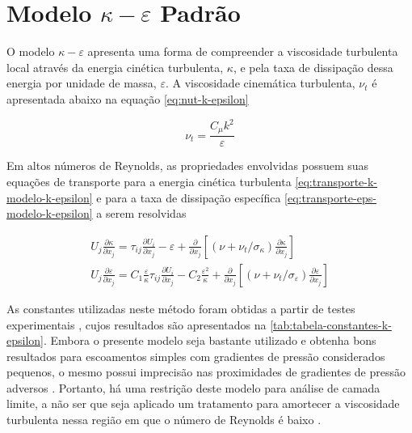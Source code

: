 \section{Modelo \texorpdfstring{\(\kappa-\varepsilon\)}{k-e} Padrão}

O modelo \(\kappa-\varepsilon\) \cite{JONES1972301,LAUNDER1974269,launder1974} apresenta uma forma de compreender a viscosidade turbulenta local através da energia cinética turbulenta, \(\kappa\), e pela taxa de dissipação dessa energia por unidade de massa, \(\varepsilon\). A viscosidade cinemática turbulenta, \(\nu_{t}\) é apresentada abaixo na equação \ref{eq:nut-k-epsilon}

\begin{equation}
    \nu_t = \frac{C_\mu k^2}{\varepsilon}
    \label{eq:nut-k-epsilon}
\end{equation}

Em altos números de Reynolds, as propriedades envolvidas possuem suas equações de transporte para a energia cinética turbulenta \ref{eq:transporte-k-modelo-k-epsilon} e para a taxa de dissipação específica \ref{eq:transporte-eps-modelo-k-epsilon} a serem resolvidas \cite{Wilcox2006}

\begin{gather}
    U_{j} \frac{\partial \kappa}{\partial x_j} = \tau_{ij}\frac{\partial U_i}{\partial x_j} - \varepsilon + \frac{\partial}{\partial x_j}\left[\left(\nu + \nu_{t}/\sigma_{\kappa}\right)\frac{\partial \kappa}{\partial x_j}\right]
    \label{eq:transporte-k-modelo-k-epsilon}
    \\
   	U_{j} \frac{\partial \varepsilon}{\partial x_j} = C_{1}\frac{\varepsilon}{\kappa}\tau_{ij}\frac{\partial U_i}{\partial x_j} - C_{2}\frac{\varepsilon^{2}}{\kappa} + \frac{\partial}{\partial x_j}\left[\left(\nu + \nu_{t}/\sigma_{\varepsilon}\right)\frac{\partial \varepsilon}{\partial x_j}\right]
    \label{eq:transporte-eps-modelo-k-epsilon}
\end{gather}
	
As constantes utilizadas neste método foram obtidas a partir de testes experimentais \cite{JONES1972301}, cujos resultados são apresentados na \autoref{tab:tabela-constantes-k-epsilon}. Embora o presente modelo seja bastante utilizado e obtenha bons resultados para escoamentos simples com gradientes de pressão considerados pequenos, o mesmo possui imprecisão nas proximidades de gradientes de pressão adversos \cite{Wilcox1988ReassessmentOT}. Portanto, há uma restrição deste modelo para análise de camada limite, a não ser que seja aplicado um tratamento para amortecer a viscosidade turbulenta nessa região em que o número de Reynolds é baixo \cite{Moukalled2015}.

